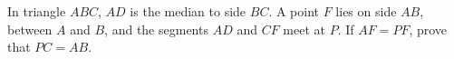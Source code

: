 In triangle $ABC$, $AD$ is the median to side $BC$. A point $F$ lies on side $AB$, between $A$ and $B$, and the segments $AD$ and $CF$ meet at $P$. If $AF=PF$, prove that $PC=AB$.
